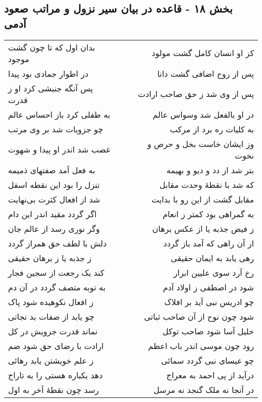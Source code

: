 \begin{center}
\section*{بخش ۱۸ - قاعده در بیان سیر نزول و مراتب صعود آدمی}
\label{sec:sh018}
\begin{longtable}{l p{0.5cm} r}
بدان اول که تا چون گشت موجود
&&
کز او انسان کامل گشت مولود
\\
در اطوار جمادی بود پیدا
&&
پس از روح اضافی گشت دانا
\\
پس آنگه جنبشی کرد او ز قدرت
&&
پس از وی شد ز حق صاحب ارادت
\\
به طفلی کرد باز احساس عالم
&&
در او بالفعل شد وسواس عالم
\\
چو جزویات شد بر وی مرتب
&&
به کلیات ره برد از مرکب
\\
غضب شد اندر او پیدا و شهوت
&&
وز ایشان خاست بخل و حرص و نخوت
\\
به فعل آمد صفتهای ذمیمه
&&
بتر شد از دد و دیو و بهیمه
\\
تنزل را بود این نقطه اسفل
&&
که شد با نقطهٔ وحدت مقابل
\\
شد از افعال کثرت بی‌نهایت
&&
مقابل گشت از این رو با بدایت
\\
اگر گردد مقید اندر این دام
&&
به گمراهی بود کمتر ز انعام
\\
وگر نوری رسد از عالم جان
&&
ز فیض جذبه یا از عکس برهان
\\
دلش با لطف حق همراز گردد
&&
از آن راهی که آمد باز گردد
\\
ز جذبه یا ز برهان حقیقی
&&
رهی یابد به ایمان حقیقی
\\
کند یک رجعت از سجین فجار
&&
رخ آرد سوی علیین ابرار
\\
به توبه متصف گردد در آن دم
&&
شود در اصطفی ز اولاد آدم
\\
ز افعال نکوهیده شود پاک
&&
چو ادریس نبی آید بر افلاک
\\
چو یابد از صفات بد نجاتی
&&
شود چون نوح از آن صاحب ثباتی
\\
نماند قدرت جزویش در کل
&&
خلیل آسا شود صاحب توکل
\\
ارادت با رضای حق شود ضم
&&
رود چون موسی اندر باب اعظم
\\
ز علم خویشتن یابد رهائی
&&
چو عیسای نبی گردد سمائی
\\
دهد یکباره هستی را به تاراج
&&
درآید از پی احمد به معراج
\\
رسد چون نقطهٔ آخر به اول
&&
در آنجا نه ملک گنجد نه مرسل
\\
\end{longtable}
\end{center}
